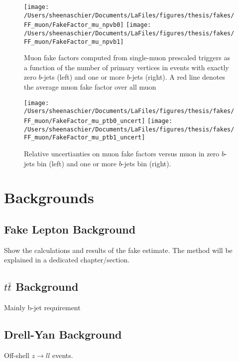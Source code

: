 \documentclass[11pt, oneside]{article}   	%
\begin{document}
\begin{figure}[tbp]
  \centering
  \texttt{[image: /Users/sheenaschier/Documents/LaFiles/figures/thesis/fakes/FF\_muon/FakeFactor\_mu\_npvb0]}
  \texttt{[image: /Users/sheenaschier/Documents/LaFiles/figures/thesis/fakes/FF\_muon/FakeFactor\_mu\_npvb1]}\\
  \caption{Muon fake factors computed from single-muon prescaled triggers as a function of the number of primary vertices in events with exactly zero $b$-jets (left) and one or more $b$-jets (right).  A red line denotes the average muon fake factor over all muon \pt{}}
  \label{fig:muon_FF_npv}
\end{figure}

\begin{figure}[tbp]
  \centering
  \texttt{[image: /Users/sheenaschier/Documents/LaFiles/figures/thesis/fakes/FF\_muon/FakeFactor\_mu\_ptb0\_uncert]}
  \texttt{[image: /Users/sheenaschier/Documents/LaFiles/figures/thesis/fakes/FF\_muon/FakeFactor\_mu\_ptb1\_uncert]}\\
  \caption{Relative uncertianties on muon fake factors versus muon \pt{} in zero $b$-jets bin (left) and one or more $b$-jets bin (right).}
  \label{fig:muon_FF_rel_uncert}
\end{figure}

 \FloatBarrier
\clearpage
\section{Backgrounds}
\label{sec:bkg}

\subsection{Fake Lepton Background}
Show the calculations and results of the fake estimate.  The method will be explained in a dedicated chapter/section.

\subsection{$t\bar{t}$ Background}
\label{sec:top}
Mainly b-jet requirement

\subsection{Drell-Yan Background}
\label{sec:mettrigger}
Off-shell $z\rightarrow ll$ events.
\end{document}
